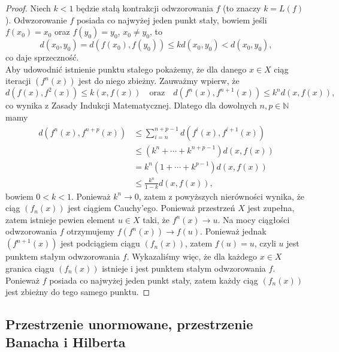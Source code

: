 \documentclass[leqno]{article}
\begin{document}
\begin{justify}
\begin{proof}
    Niech $k < 1$ będzie stałą kontrakcji odwzorowania $f$ (to znaczy $k = L(f)$).
    Odwzorowanie $f$ posiada co najwyżej jeden punkt stały, bowiem jeśli $f(x_0) = x_0$ oraz
    $f(y_0) = y_0$, $x_0 \neq y_0$, to 
    \[
        d(x_0, y_0) = d(f(x_0), f(y_0)) \leqslant kd(x_0, y_0) < d(x_0, y_0),
    \]
    co daje sprzeczność. \\
    Aby udowodnić istnienie punktu stałego pokażemy, że dla danego $x \in X$ ciąg iteracji $(f^n(x))$ jest do niego zbieżny. Zauważmy wpierw, że 
    \[
        d(f(x), f^2(x)) \leqslant k(x, f(x)) \quad \text{oraz} \quad d(f^n(x), f^{n+1}(x)) \leqslant k^{n}d(x, f(x)),
    \]
    co wynika z Zasady Indukcji Matematycznej. Dlatego dla dowolnych $n, p \in \mathbb{N}$ mamy 
    \begin{align*}
        d(f^n(x), f^{n+p}(x)) &\leqslant \sum_{i=n}^{n+p-1}d(f^i(x), f^{i+1}(x)) \\
                              &\leqslant (k^n + \cdots + k^{n+p-1})d(x, f(x)) \\
                              &=k^n(1 + \cdots + k^{p-1})d(x, f(x)) \\
                              &\leqslant \frac{k^n}{1-k}d(x, f(x)),
    \end{align*}
    bowiem $0 < k < 1$. Ponieważ $k^n \to 0$, zatem z powyższych nierówności wynika, że ciąg
    $(f_n(x))$ jest ciągiem Cauchy'ego. Ponieważ przestrzeń $X$ jest zupełna, zatem istnieje pewien element $u \in X$ taki, że 
    $f^n(x) \to u$. Na mocy ciągłości odwzorowania $f$ otrzymujemy $f(f^n(x)) \to f(u)$. Ponieważ jednak
    $(f^{n+1}(x))$ jest podciągiem ciągu $(f_n(x))$, zatem $f(u) = u$, czyli $u$ jest punktem stałym odwzorowania $f$.
    Wykazaliśmy więc, że dla każdego $x \in X$ granica ciągu $(f_n(x))$ istnieje i jest punktem stałym odwzorowania $f$.
    Ponieważ $f$ posiada co najwyżej jeden punkt stały, zatem każdy ciąg $(f_n(x))$ jest zbieżny do tego samego punktu.
\end{proof}

\subsection{Przestrzenie unormowane, przestrzenie Banacha i Hilberta}


\end{justify}
\end{document}
